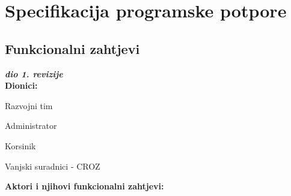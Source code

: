 \chapter{Specifikacija programske potpore}

\section{Funkcionalni zahtjevi}

\textbf{\textit{dio 1. revizije}}\\



\noindent \textbf{Dionici:}

\begin{packed_enum}
	
	\item Razvojni tim
	\item Administrator			
	\item Korsinik
	\item Vanjski suradnici - CROZ
	
\end{packed_enum}

\noindent \textbf{Aktori i njihovi funkcionalni zahtjevi:}


